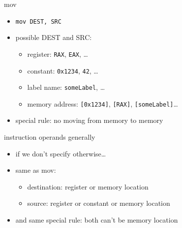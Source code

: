 \begin{frame}[fragile,label=mov]{mov}
\lstset{language=myasm}
\begin{itemize}
\item \lstinline|mov DEST, SRC|
\item possible DEST and SRC:
\begin{itemize}
\item register: \texttt{RAX}, \texttt{EAX}, \ldots
\item constant: \texttt{0x1234}, \texttt{42}, \ldots
\item label name: \texttt{someLabel}, \ldots
\item memory address: \texttt{[0x1234]}, \texttt{[RAX]}, \texttt{[someLabel]}\ldots
\end{itemize}
\item special rule: no moving from memory to memory
\end{itemize}
\end{frame}

\begin{frame}{instruction operands generally}
\begin{itemize}
\item if we don't specify otherwise\ldots
\item same as mov:
    \begin{itemize}
    \item destination: register or memory location
    \item source: register or constant or memory location
    \end{itemize}
\item and same special rule: both can't be memory location
\end{itemize}
\end{frame}
